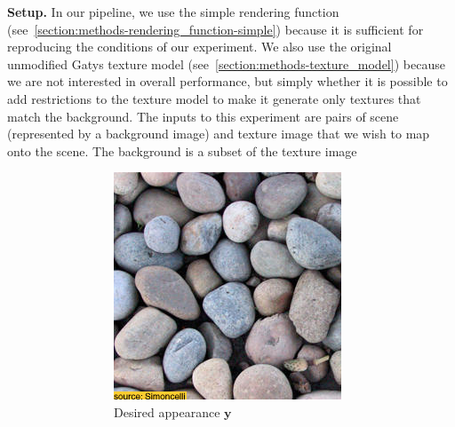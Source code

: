 \textbf{Setup.} In our pipeline, we use the simple rendering function (see~\ref{section:methods-rendering_function-simple}) because it is sufficient for reproducing the conditions of our experiment. We also use the original unmodified Gatys texture model (see~\ref{section:methods-texture_model}) because we are not interested in overall performance, but simply whether it is possible to add restrictions to the texture model to make it generate only textures that match the background. The inputs to this experiment are pairs of scene (represented by a background image) and texture image that we wish to map onto the scene. The background is a subset of the texture image

\begin{figure}[]
    \centering    
    \begin{subfigure}{\textwidth}
        \centering
        \begin{subfigure}{0.24\textwidth}
            \centering
            \includegraphics[width=\textwidth]{images/04-experiment01/pebbles/target.jpg}
            \caption{Desired appearance \(\bm{y}\)}
            \label{fig:ex01-pebbles-1000steps-some_target}
        \end{subfigure}
        \hfill
        \begin{subfigure}{0.24\textwidth}
            \centering

\end{subfigure}
\end{subfigure}
\end{figure}
